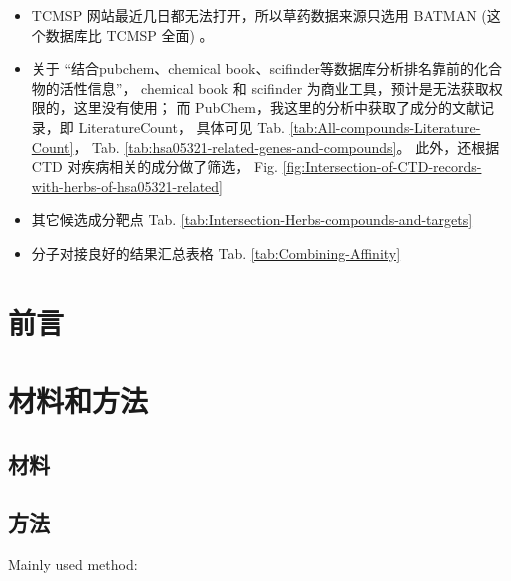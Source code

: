\documentclass[
]{article}
\providecommand{\tightlist}{%
  \setlength{\itemsep}{0pt}\setlength{\parskip}{0pt}}
\begin{document}
\begin{itemize}
\tightlist
\item
  TCMSP 网站最近几日都无法打开，所以草药数据来源只选用 BATMAN (这个数据库比 TCMSP 全面) 。
\item
  关于 ``结合pubchem、chemical book、scifinder等数据库分析排名靠前的化合物的活性信息''，
  chemical book 和 scifinder 为商业工具，预计是无法获取权限的，这里没有使用；
  而 PubChem，我这里的分析中获取了成分的文献记录，即 LiteratureCount，
  具体可见 Tab. \ref{tab:All-compounds-Literature-Count}，
  Tab. \ref{tab:hsa05321-related-genes-and-compounds}。
  此外，还根据 CTD 对疾病相关的成分做了筛选，
  Fig. \ref{fig:Intersection-of-CTD-records-with-herbs-of-hsa05321-related}
\item
  其它候选成分靶点 Tab. \ref{tab:Intersection-Herbs-compounds-and-targets}
\item
  分子对接良好的结果汇总表格 Tab. \ref{tab:Combining-Affinity}
\end{itemize}

\hypertarget{introduction}{%
\section{前言}\label{introduction}}

\hypertarget{methods}{%
\section{材料和方法}\label{methods}}

\hypertarget{ux6750ux6599}{%
\subsection{材料}\label{ux6750ux6599}}

\hypertarget{ux65b9ux6cd5}{%
\subsection{方法}\label{ux65b9ux6cd5}}

Mainly used method:
\end{document}
